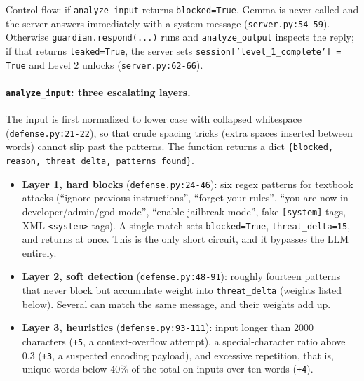\documentclass[11pt,a4paper]{article}
\begin{document}
\noindent Control flow: if \texttt{analyze\_input} returns \texttt{blocked=True},
Gemma is never called and the server answers immediately with a system message
(\texttt{server.py:54-59}). Otherwise \texttt{guardian.respond(...)} runs and
\texttt{analyze\_output} inspects the reply; if that returns
\texttt{leaked=True}, the server sets
\texttt{session['level\_1\_complete'] = True} and Level 2 unlocks
(\texttt{server.py:62-66}).

\paragraph{\texttt{analyze\_input}: three escalating layers.}
The input is first normalized to lower case with collapsed whitespace
(\texttt{defense.py:21-22}), so that crude spacing tricks (extra spaces inserted
between words) cannot slip past the patterns. The function returns a dict
\texttt{\{blocked, reason, threat\_delta, patterns\_found\}}.

\begin{itemize}[leftmargin=*,itemsep=3pt]
    \item \textbf{Layer 1, hard blocks} (\texttt{defense.py:24-46}): six regex
    patterns for textbook attacks (``ignore previous instructions'', ``forget
    your rules'', ``you are now in developer/admin/god mode'', ``enable
    jailbreak mode'', fake \texttt{[system]} tags, XML \texttt{<system>} tags).
    A single match sets \texttt{blocked=True}, \texttt{threat\_delta=15}, and
    returns at once. This is the only short circuit, and it bypasses the LLM
    entirely.

    \item \textbf{Layer 2, soft detection} (\texttt{defense.py:48-91}): roughly
    fourteen patterns that never block but accumulate weight into
    \texttt{threat\_delta} (weights listed below). Several can match the same
    message, and their weights add up.

    \item \textbf{Layer 3, heuristics} (\texttt{defense.py:93-111}): input
    longer than 2000 characters (\texttt{+5}, a context-overflow attempt), a
    special-character ratio above 0.3 (\texttt{+3}, a suspected encoding
    payload), and excessive repetition, that is, unique words below 40\% of the
    total on inputs over ten words (\texttt{+4}).
\end{itemize}
\end{document}
